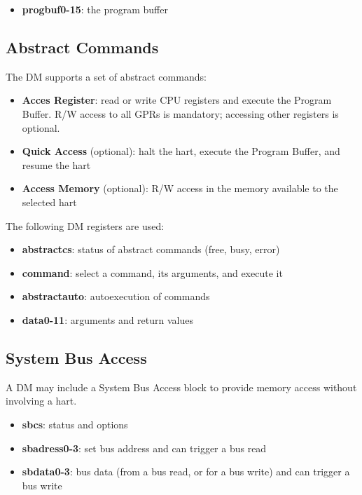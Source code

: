 \documentclass{article}
\begin{document}
	\begin{itemize}
	\item \textbf{progbuf0-15}: the program buffer
	\end{itemize}
	
	\subsection{Abstract Commands}
	
	The DM supports a set of abstract commands:
	
	\begin{itemize}
	\item \textbf{Acces Register}: read or write CPU registers and execute the Program Buffer. R/W access to all GPRs is mandatory; accessing other registers is optional.
	\item \textbf{Quick Access} (optional): halt the hart, execute the Program Buffer, and resume the hart
	\item \textbf{Access Memory} (optional): R/W access in the memory available to the selected hart
	\end{itemize}
	
	The following DM registers are used:
	
	\begin{itemize}
	\item \textbf{abstractcs}: status of abstract commands (free, busy, error)
	\item \textbf{command}: select a command, its arguments, and execute it
	\item \textbf{abstractauto}: autoexecution of commands
	\item \textbf{data0-11}: arguments and return values
	\end{itemize}
	
	\subsection{System Bus Access}
	
	A DM may include a System Bus Access block to provide memory access without involving a hart.
	
	\begin{itemize}
	\item \textbf{sbcs}: status and options
	\item \textbf{sbadress0-3}: set bus address and can trigger a bus read
	\item \textbf{sbdata0-3}: bus data (from a bus read, or for a bus write) and can trigger a bus write
	\end{itemize}
	
\end{document}
